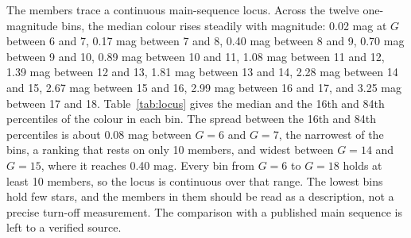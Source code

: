 \documentclass[11pt]{article}
\begin{document}
The members trace a continuous main-sequence locus. Across the twelve one-magnitude bins, the median colour rises steadily with magnitude: 0.02 mag at $G$ between 6 and 7, 0.17 mag between 7 and 8, 0.40 mag between 8 and 9, 0.70 mag between 9 and 10, 0.89 mag between 10 and 11, 1.08 mag between 11 and 12, 1.39 mag between 12 and 13, 1.81 mag between 13 and 14, 2.28 mag between 14 and 15, 2.67 mag between 15 and 16, 2.99 mag between 16 and 17, and 3.25 mag between 17 and 18.
Table~\ref{tab:locus} gives the median and the 16th and 84th percentiles of the colour in each bin. The spread between the 16th and 84th percentiles is about 0.08 mag between $G = 6$ and $G = 7$, the narrowest of the bins, a ranking that rests on only 10 members, and widest between $G = 14$ and $G = 15$, where it reaches 0.40 mag.
Every bin from $G = 6$ to $G = 18$ holds at least 10 members, so the locus is continuous over that range. The lowest bins hold few stars, and the members in them should be read as a description, not a precise turn-off measurement. The comparison with a published main sequence is left to a verified source.


\end{document}
